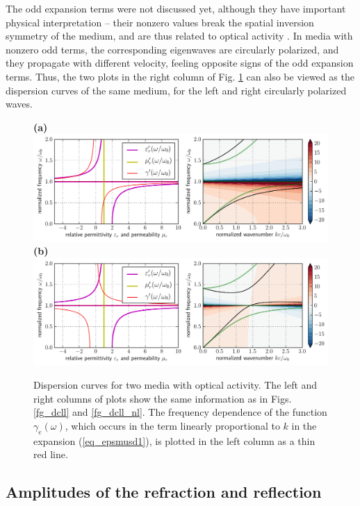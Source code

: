 The odd expansion terms were not discussed yet, although they have important physical interpretation -- their nonzero values break the spatial inversion symmetry of the medium, and are thus related to optical activity \cite{bungay1993equivalency}. 
In media with nonzero odd terms, the corresponding eigenwaves are circularly polarized, and they propagate with different velocity, feeling opposite signs of the odd expansion terms. Thus, the two plots in the right column of Fig. \ref{fg_dcllactivity} can also be viewed as the dispersion curves of the same medium, for the left and right circularly polarized waves.

\begin{figure}[t] \caption{Dispersion curves for two media with optical activity. The left and right columns of plots show the same information as in Figs. \ref{fg_dcll} and \ref{fg_dcll_nl}. The frequency dependence of the function $\gamma_e(\omega)$, which occurs in the term linearly proportional to $k$ in the expansion (\ref{eq_epsmusd1}), is plotted in the left column as a thin red line. } \label{fg_dcllactivity} \centering  
\textbf{(a)}\\\includegraphics[width=1\textwidth]{img/dispersion_landau_lifshitz/dispersion_ll_activep.pdf}
\textbf{(b)}\\\includegraphics[width=1\textwidth]{img/dispersion_landau_lifshitz/dispersion_ll_activen.pdf}
\end{figure}


\subsection{Amplitudes of the refraction and reflection}
